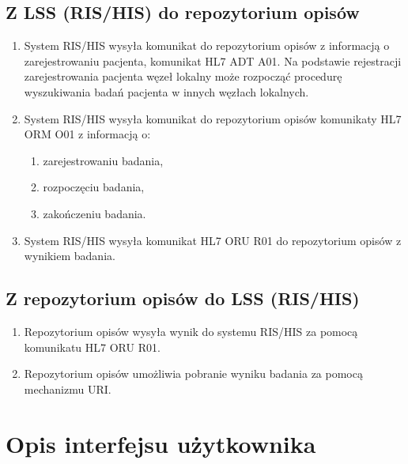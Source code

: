 \documentclass[a4paper]{report}
\begin{document}
\subsection{Z LSS (RIS/HIS) do repozytorium opisów}

\begin{enumerate}
  \item System RIS/HIS wysyła komunikat do repozytorium opisów z informacją o zarejestrowaniu pacjenta, komunikat HL7 ADT A01. Na podstawie rejestracji zarejestrowania pacjenta węzeł lokalny może rozpocząć procedurę wyszukiwania badań pacjenta w innych węzłach lokalnych.
  \item System RIS/HIS wysyła komunikat do repozytorium opisów komunikaty HL7 ORM O01 z informacją o:
    \begin{enumerate}
      \item zarejestrowaniu badania,
      \item rozpoczęciu badania,
      \item zakończeniu badania.
    \end{enumerate}
  \item System RIS/HIS wysyła komunikat HL7 ORU R01 do repozytorium opisów z wynikiem badania.
\end{enumerate}

\subsection{Z repozytorium opisów do LSS (RIS/HIS)}

\begin{enumerate}
  \item Repozytorium opisów wysyła wynik do systemu RIS/HIS za pomocą komunikatu HL7 ORU R01.
  \item Repozytorium opisów umożliwia pobranie wyniku badania za pomocą mechanizmu URI.
\end{enumerate}


\section{Opis interfejsu użytkownika}
\end{document}
